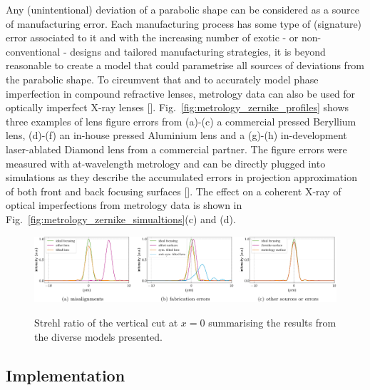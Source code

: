 \begin{refsection}
Any (unintentional) deviation of a parabolic shape can be considered as a source of manufacturing error. Each manufacturing process has some type of (signature) error associated to it and with the increasing number of exotic - or non-conventional - designs and tailored manufacturing strategies, it is beyond reasonable to create a model that could parametrise all sources of deviations from the parabolic shape. To circumvent that and to accurately model phase imperfection in compound refractive lenses, metrology data can also be used for optically imperfect X-ray lenses [\cite{Celestre2020, Chubar2020}]. Fig.~\ref{fig:metrology_zernike_profiles} shows three examples of lens figure errors from (a)-(c) a commercial pressed Beryllium lens, (d)-(f) an in-house pressed Aluminium lens and a (g)-(h) in-development laser-ablated Diamond lens from a commercial partner. The figure errors were measured with at-wavelength metrology and can be directly plugged into simulations as they describe the accumulated errors in projection approximation of both front and back focusing surfaces [\cite{Celestre2020, Berujon2020a, Berujon2020}]. The effect on a coherent X-ray of optical imperfections from metrology data is shown in Fig.~\ref{fig:metrology_zernike_simualtions}(c) and (d).

\begin{figure}[t]
        \centering
        {\includegraphics[width=1.\linewidth]{figures/ch04/Strehl}}
        \caption[Strehl ratio summarising the results from the diverse models presented]{Strehl ratio of the vertical cut at $x=0$ summarising the results from the diverse models presented.} \label{fig:Strehl}
\end{figure}

\subsection{Implementation}


\end{refsection}
